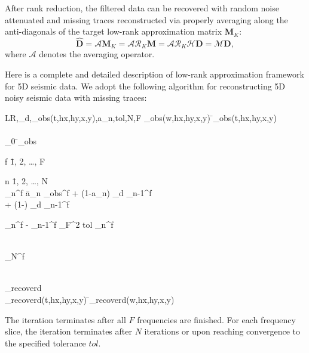 After rank reduction, the filtered data can be recovered with random noise attenuated and missing traces reconstructed via properly averaging along the anti-diagonals of the target low-rank approximation matrix $\mathbf{M}_K$: 
\begin{equation}
\label{eq:mssaopt}
\hat{\mathbf{D}}=\mathcal{A}\mathbf{M}_{K}=\mathcal{A}\mathcal{R}_K\mathbf{M}=
\mathcal{A}\mathcal{R}_K\mathcal{H}\mathbf{D}=\mathcal{M}\mathbf{D},
\end{equation}
where $\mathcal{A}$ denotes the averaging operator. 

Here is a complete and detailed description of low-rank approximation framework for 5D seismic data. We adopt the following algorithm for reconstructing 5D noisy seismic data with missing traces:
\begin{algorithm}{LR}{,_d,_{obs}(t,hx,hy,x,y),a_n,tol,N,F}
	_{obs}(w,hx,hy,x,y) \= _{obs}(t,hx,hy,x,y)\\
	  \\
	_0 \= _{obs} \\
	\begin{FOR}{f \= 1, 2, \ldots, F} \\	
		\begin{FOR}{n \= 1, 2, \ldots, N} \\
			_n^f \= a_n _{obs}^f + (1-a_n)  \circ {}_d _{n-1}^f\\
			 + (1-) \circ {}_d _{n-1}^f\\
			\begin{IF}{\Arrowvert \mathbf{D}_n^f - _{n-1}^f \Arrowvert_F^2 \leq tol} 
				\RETURN {}_n^f
			\end{IF}     
		\end{FOR} \\
		\RETURN {}_N^f
	\end{FOR}\\ 
	\RETURN {}_{recoverd}\\
	_{recoverd}(t,hx,hy,x,y) \= _{recoverd}(w,hx,hy,x,y) \\
\end{algorithm}
The iteration terminates after all $F$ frequencies are finished. For each frequency slice, the iteration terminates after $N$ iterations or upon reaching convergence to the specified tolerance $tol$.


